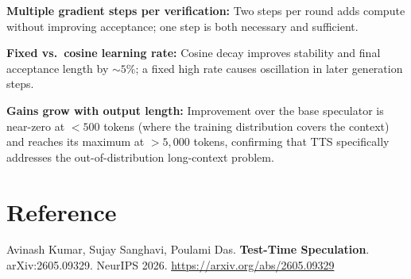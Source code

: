 \documentclass[10pt,twocolumn]{article}
\begin{document}
\textbf{Multiple gradient steps per verification:}
Two steps per round adds compute without improving acceptance; one step is
both necessary and sufficient.

\textbf{Fixed vs.\ cosine learning rate:}
Cosine decay improves stability and final acceptance length by $\sim 5\%$;
a fixed high rate causes oscillation in later generation steps.

\textbf{Gains grow with output length:}
Improvement over the base speculator is near-zero at $< 500$ tokens (where
the training distribution covers the context) and reaches its maximum at
$> 5{,}000$ tokens, confirming that TTS specifically addresses the
out-of-distribution long-context problem.

\section*{Reference}

Avinash Kumar, Sujay Sanghavi, Poulami Das.
\textbf{Test-Time Speculation}.
arXiv:2605.09329. NeurIPS 2026.
\url{https://arxiv.org/abs/2605.09329}
\end{document}
